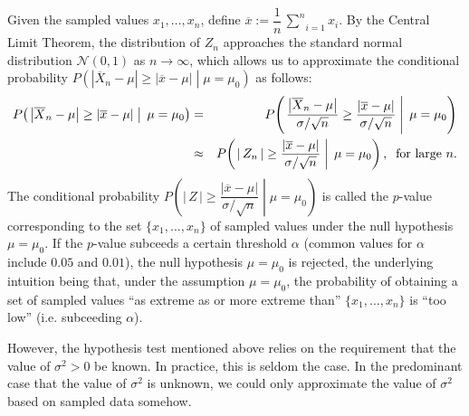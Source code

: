 \documentclass{article}
\begin{document}
\begin{itemize}
          Given the sampled values $x_{1}, \ldots, x_{n}$, define
          $\overline{x} := \dfrac{1}{n}\,\underset{i=1}{\overset{n}{\sum}}x_{i}$.
          By the Central Limit Theorem, the distribution of $Z_{n}$ approaches
          the standard normal distribution $\mathcal{N}(0,1)$ as $n\longrightarrow\infty$,
          which allows us to approximate the conditional probability
          $P\!\left(\left.\left\vert\overline{X}_{n}-\mu\right\vert\geq\left\vert\overline{x}-\mu\right\vert\;\right\vert\;\mu=\mu_{0}\right)$
          as follows:
          \begin{eqnarray*}
          P\!\left(\left.\left\vert\overline{X}_{n}-\mu\right\vert \geq \left\vert\overline{x}-\mu\right\vert\;\right\vert\;\mu=\mu_{0}\right)
          &=&
          P\!\left(\left.\dfrac{\left\vert\overline{X}_{n}-\mu\right\vert}{\sigma/\sqrt{n}}
                            \geq
                            \dfrac{\left\vert\overline{x}-\mu\right\vert}{\sigma/\sqrt{n}}
          \;\right\vert\;\mu=\mu_{0}\right) \\
          &\approx&
          P\!\left(\left.\left\vert\,Z_{n}\,\right\vert
                            \geq
                            \dfrac{\left\vert\overline{x}-\mu\right\vert}{\sigma/\sqrt{n}}
          \;\right\vert\;\mu=\mu_{0}\right),
          \;\;\textnormal{for large $n$.}
          \end{eqnarray*}
          The conditional probability
          $P\!\left(\left.\left\vert\,Z\,\right\vert\geq\dfrac{\left\vert\overline{x}-\mu\right\vert}{\sigma/\sqrt{n}}\;\right\vert\;\mu=\mu_{0}\right)$ is called the $p$-value corresponding to the set $\{x_{1},\ldots,x_{n}\}$ of sampled values
          under the null hypothesis $\mu = \mu_{0}$.  If the $p$-value subceeds a certain threshold $\alpha$
          (common values for $\alpha$ include $0.05$ and $0.01$), the null hypothesis $\mu=\mu_{0}$ is rejected,
          the underlying intuition being that, under the assumption $\mu=\mu_{0}$, the probability of
          obtaining a set of sampled values ``as extreme as or more extreme than''
          $\{x_{1},\ldots,x_{n}\}$ is ``too low'' (i.e. subceeding $\alpha$).
\end{itemize}
However, the hypothesis test mentioned above relies on the requirement that the value of $\sigma^{2} > 0$ be known.  In practice, this is seldom the case.  In the predominant case that the value of $\sigma^{2}$ is unknown, we could only approximate the value of $\sigma^{2}$ based on sampled data somehow.
\end{document}

